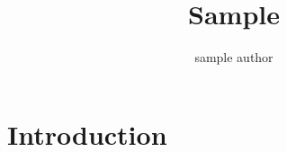 \documentclass[twocolumn,10pt]{article}
\begin{document}
\title{
	Sample
}

\author{sample author}


\date{}

\maketitle

\begin{abstract}
\lipsum[1]
\end{abstract}

\section{Introduction}
\lipsum[2-15]

%
%
\end{document}
